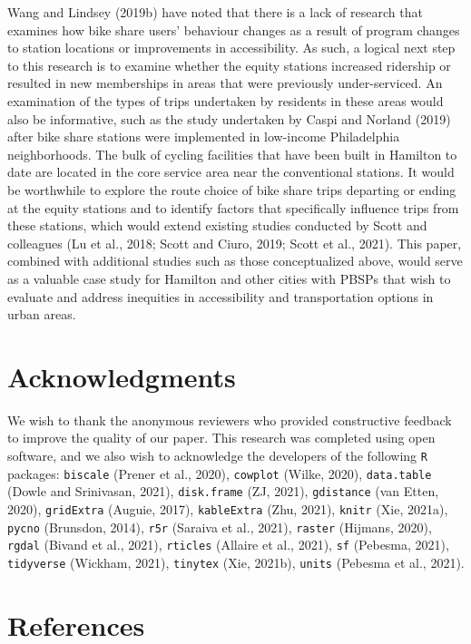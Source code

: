 \documentclass[]{elsarticle} %
\begin{document}
Wang and Lindsey (2019b) have noted that there is a lack of research
that examines how bike share users' behaviour changes as a result of
program changes to station locations or improvements in accessibility.
As such, a logical next step to this research is to examine whether the
equity stations increased ridership or resulted in new memberships in
areas that were previously under-serviced. An examination of the types
of trips undertaken by residents in these areas would also be
informative, such as the study undertaken by Caspi and Norland (2019)
after bike share stations were implemented in low-income Philadelphia
neighborhoods. The bulk of cycling facilities that have been built in
Hamilton to date are located in the core service area near the
conventional stations. It would be worthwhile to explore the route
choice of bike share trips departing or ending at the equity stations
and to identify factors that specifically influence trips from these
stations, which would extend existing studies conducted by Scott and
colleagues (Lu et al., 2018; Scott and Ciuro, 2019; Scott et al., 2021).
This paper, combined with additional studies such as those
conceptualized above, would serve as a valuable case study for Hamilton
and other cities with PBSPs that wish to evaluate and address inequities
in accessibility and transportation options in urban areas.

\hypertarget{acknowledgments}{%
\section{Acknowledgments}\label{acknowledgments}}

We wish to thank the anonymous reviewers who provided constructive
feedback to improve the quality of our paper. This research was
completed using open software, and we also wish to acknowledge the
developers of the following \texttt{R} packages: \texttt{biscale}
(Prener et al., 2020), \texttt{cowplot} (Wilke, 2020),
\texttt{data.table} (Dowle and Srinivasan, 2021), \texttt{disk.frame}
(ZJ, 2021), \texttt{gdistance} (van Etten, 2020), \texttt{gridExtra}
(Auguie, 2017), \texttt{kableExtra} (Zhu, 2021), \texttt{knitr} (Xie,
2021a), \texttt{pycno} (Brunsdon, 2014), \texttt{r5r} (Saraiva et al.,
2021), \texttt{raster} (Hijmans, 2020), \texttt{rgdal} (Bivand et al.,
2021), \texttt{rticles} (Allaire et al., 2021), \texttt{sf} (Pebesma,
2021), \texttt{tidyverse} (Wickham, 2021), \texttt{tinytex} (Xie,
2021b), \texttt{units} (Pebesma et al., 2021).

\hypertarget{references}{%
\section*{References}\label{references}}
\end{document}

